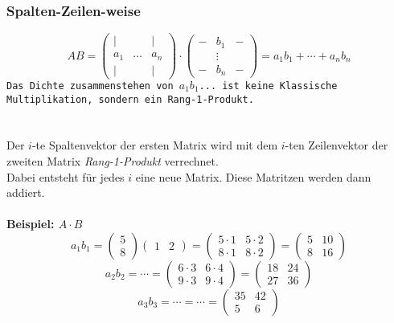 \documentclass[12pt,a4paper]{article}
\begin{document}
\subsubsection{Spalten-Zeilen-weise}
\[
AB =
\begin{pmatrix}
    \vert & & \vert \\
    a_1 & \dots & a_n \\
    \vert & & \vert
\end{pmatrix}
\cdot
\begin{pmatrix}
    - & b_1 & - \\
    & \vdots & \\
    - & b_n & -
\end{pmatrix}
=
a_1b_1 + \cdots + a_nb_n
\]
\texttt{Das Dichte zusammenstehen von $a_1b_1$... ist keine Klassische Multiplikation, sondern ein Rang-1-Produkt.} \\
\\ \\
Der $i$-te Spaltenvektor der ersten Matrix wird mit dem $i$-ten Zeilenvektor der zweiten Matrix \textit{Rang-1-Produkt} verrechnet. \\ Dabei entsteht für jedes $i$ eine neue Matrix. Diese Matritzen werden dann addiert. \\ \\
\textbf{Beispiel: $A \cdot B$} \\
\[
a_1b_1 = \begin{pmatrix}
    5 \\
    8
\end{pmatrix}
\begin{pmatrix}
    1 & 2
\end{pmatrix}
=
\begin{pmatrix}
    5 \cdot 1 & 5 \cdot 2 \\
    8 \cdot 1 & 8 \cdot 2
\end{pmatrix}
=
\begin{pmatrix}
    5 & 10 \\
    8 & 16
\end{pmatrix}
\]
\[
a_2b_2 = \cdots = \begin{pmatrix}
    6 \cdot 3 & 6 \cdot 4 \\
    9 \cdot 3 & 9 \cdot 4
\end{pmatrix}
=
\begin{pmatrix}
    18 & 24 \\
    27 & 36
\end{pmatrix}
\]
\[
a_3b_3 = \cdots = \cdots = \begin{pmatrix}
    35 & 42 \\
    5 & 6
\end{pmatrix}
\]
\end{document}
